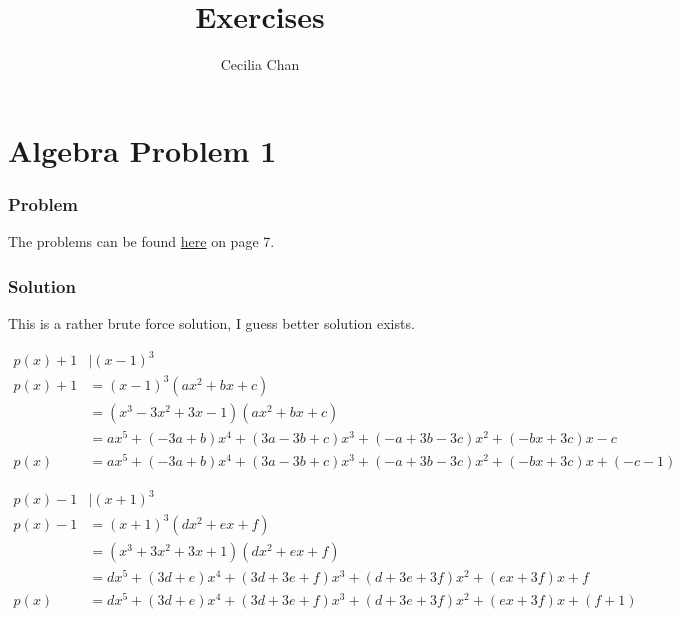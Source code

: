 \documentclass{article}
\title{Exercises}
\author{Cecilia Chan}
\begin{document}
\maketitle

\section*{Algebra Problem 1}
\subsubsection*{Problem}
The problems can be found \href{https://www.math.hkust.edu.hk/~makyli/190_2010Sp/problemBk.pdf}{here} on page 7.

\subsubsection*{Solution}
This is a rather brute force solution, I guess better solution exists.

\begin{align*}
  p(x) + 1 &| (x - 1)^3                                                                           \\
  p(x) + 1 &= (x - 1)^3(ax^2 + bx + c)                                                            \\
           &= (x^3 - 3x^2 + 3x - 1)(ax^2 + bx + c)                                                \\
           &= ax^5 + (-3a + b)x^4 + (3a - 3b + c)x^3 + (-a + 3b - 3c)x^2 + (-bx + 3c)x - c        \\
      p(x) &= ax^5 + (-3a + b)x^4 + (3a - 3b + c)x^3 + (-a + 3b - 3c)x^2 + (-bx + 3c)x + (-c - 1)
\end{align*}

\begin{align*}
  p(x) - 1 &| (x + 1)^3                                                                       \\
  p(x) - 1 &= (x + 1)^3(dx^2 + ex + f)                                                        \\
           &= (x^3 + 3x^2 + 3x + 1)(dx^2 + ex + f)                                            \\
           &= dx^5 + (3d + e)x^4 + (3d + 3e + f)x^3 + (d + 3e + 3f)x^2 + (ex + 3f)x + f       \\
      p(x) &= dx^5 + (3d + e)x^4 + (3d + 3e + f)x^3 + (d + 3e + 3f)x^2 + (ex + 3f)x + (f + 1) \\
\end{align*}
\end{document}

